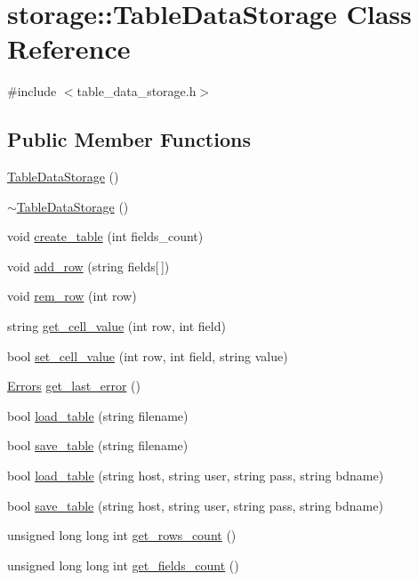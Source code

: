 \hypertarget{classstorage_1_1TableDataStorage}{
\section{storage::TableDataStorage Class Reference}
\label{df/d87/classstorage_1_1TableDataStorage}
}


{\ttfamily \#include $<$table\_\-data\_\-storage.h$>$}

\subsection*{Public Member Functions}
\begin{DoxyCompactItemize}
\item 
\hyperlink{classstorage_1_1TableDataStorage_a91d68894f40a7ed48041d6da83bcbb6f}{TableDataStorage} ()
\item 
\hyperlink{classstorage_1_1TableDataStorage_a6e988f0e5213f79711eaa15dce114df4}{$\sim$TableDataStorage} ()
\item 
void \hyperlink{classstorage_1_1TableDataStorage_a659685562ccafaa19e8f1e58ce6576c1}{create\_\-table} (int fields\_\-count)
\item 
void \hyperlink{classstorage_1_1TableDataStorage_a6f62b42d9309e7792f029d53b51816ba}{add\_\-row} (string fields\mbox{[}$\,$\mbox{]})
\item 
void \hyperlink{classstorage_1_1TableDataStorage_ab2aee9b1629a1bd21daf490d85e39c29}{rem\_\-row} (int row)
\item 
string \hyperlink{classstorage_1_1TableDataStorage_a4366051dffb6a58c1c2d9c9b6bb5c4b0}{get\_\-cell\_\-value} (int row, int field)
\item 
bool \hyperlink{classstorage_1_1TableDataStorage_a8562901c5f3864d68e8df2e68f334640}{set\_\-cell\_\-value} (int row, int field, string value)
\item 
\hyperlink{namespacestorage_aedd3c880e9744762de535deb2adcf6be}{Errors} \hyperlink{classstorage_1_1TableDataStorage_a6b4bfe6422d92d6561b14e4c5b4bc423}{get\_\-last\_\-error} ()
\item 
bool \hyperlink{classstorage_1_1TableDataStorage_a6f3a1ad98a2018e095f6bbcffdfeb9a8}{load\_\-table} (string filename)
\item 
bool \hyperlink{classstorage_1_1TableDataStorage_a408e93fa9efee49c3809e4afcc0d58e0}{save\_\-table} (string filename)
\item 
bool \hyperlink{classstorage_1_1TableDataStorage_a0d5d76c0db83f278d6e3e2dd08094d36}{load\_\-table} (string host, string user, string pass, string bdname)
\item 
bool \hyperlink{classstorage_1_1TableDataStorage_ac4ea64d9efd96af23f621500606adbe3}{save\_\-table} (string host, string user, string pass, string bdname)
\item 
unsigned long long int \hyperlink{classstorage_1_1TableDataStorage_a49af804e3b872ae12f67d4d0b78ca7ab}{get\_\-rows\_\-count} ()
\item 
unsigned long long int \hyperlink{classstorage_1_1TableDataStorage_a2a1cad158e2c20292f9474403ca4c6ef}{get\_\-fields\_\-count} ()
\end{DoxyCompactItemize}


